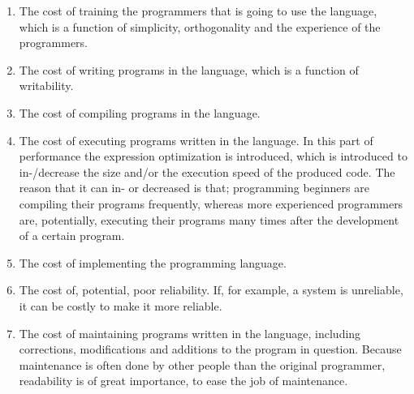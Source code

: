 \begin{enumerate}
	\item The cost of training the programmers that is going to use the language, which is a function of simplicity, orthogonality and the experience of the programmers.
	\item The cost of writing programs in the language, which is a function of writability.
	\item The cost of compiling programs in the language.
	\item The cost of executing programs written in the language. In this part of performance the expression optimization is introduced, which is introduced to in-/decrease the size and/or the execution speed of the produced code. The reason that it can in- or decreased is that; programming beginners are compiling their programs frequently, whereas more experienced programmers are, potentially, executing their programs many times after the development of a certain program.
	\item The cost of implementing the programming language.
	\item The cost of, potential, poor reliability. If, for example, a system is unreliable, it can be costly to make it more reliable.
	\item The cost of maintaining programs written in the language, including corrections, modifications and additions to the program in question. Because maintenance is often done by other people than the original programmer, readability is of great importance, to ease the job of maintenance.
\end{enumerate}

